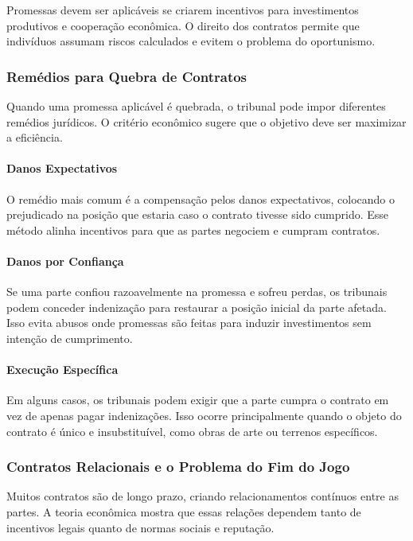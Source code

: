 \documentclass[a4paper,12pt]{article}[abntex2]
\begin{document}
Promessas devem ser aplicáveis se criarem incentivos para investimentos produtivos e cooperação econômica. O direito dos contratos permite que indivíduos assumam riscos calculados e evitem o problema do oportunismo.

\subsubsection{Remédios para Quebra de Contratos}

Quando uma promessa aplicável é quebrada, o tribunal pode impor diferentes remédios jurídicos. O critério econômico sugere que o objetivo deve ser maximizar a eficiência.

\paragraph{Danos Expectativos}
O remédio mais comum é a compensação pelos danos expectativos, colocando o prejudicado na posição que estaria caso o contrato tivesse sido cumprido. Esse método alinha incentivos para que as partes negociem e cumpram contratos.

\paragraph{Danos por Confiança}
Se uma parte confiou razoavelmente na promessa e sofreu perdas, os tribunais podem conceder indenização para restaurar a posição inicial da parte afetada. Isso evita abusos onde promessas são feitas para induzir investimentos sem intenção de cumprimento.

\paragraph{Execução Específica}
Em alguns casos, os tribunais podem exigir que a parte cumpra o contrato em vez de apenas pagar indenizações. Isso ocorre principalmente quando o objeto do contrato é único e insubstituível, como obras de arte ou terrenos específicos.

\subsubsection{Contratos Relacionais e o Problema do Fim do Jogo}

Muitos contratos são de longo prazo, criando relacionamentos contínuos entre as partes. A teoria econômica mostra que essas relações dependem tanto de incentivos legais quanto de normas sociais e reputação.
\end{document}
